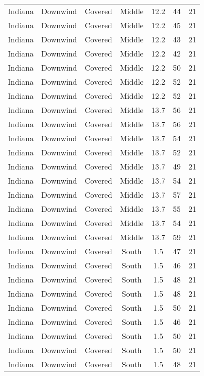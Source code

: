 \documentclass{article}
\begin{document}
\begin{longtable}[H]{ccccccc}
Indiana & Downwind & Covered     & Middle & 12.2 & 44 & 21 \\
Indiana & Downwind & Covered     & Middle & 12.2 & 45 & 21 \\
Indiana & Downwind & Covered     & Middle & 12.2 & 43 & 21 \\
Indiana & Downwind & Covered     & Middle & 12.2 & 42 & 21 \\
Indiana & Downwind & Covered     & Middle & 12.2 & 50 & 21 \\
Indiana & Downwind & Covered     & Middle & 12.2 & 52 & 21 \\
Indiana & Downwind & Covered     & Middle & 12.2 & 52 & 21 \\
Indiana & Downwind & Covered     & Middle & 13.7 & 56 & 21 \\
Indiana & Downwind & Covered     & Middle & 13.7 & 56 & 21 \\
Indiana & Downwind & Covered     & Middle & 13.7 & 54 & 21 \\
Indiana & Downwind & Covered     & Middle & 13.7 & 52 & 21 \\
Indiana & Downwind & Covered     & Middle & 13.7 & 49 & 21 \\
Indiana & Downwind & Covered     & Middle & 13.7 & 54 & 21 \\
Indiana & Downwind & Covered     & Middle & 13.7 & 57 & 21 \\
Indiana & Downwind & Covered     & Middle & 13.7 & 55 & 21 \\
Indiana & Downwind & Covered     & Middle & 13.7 & 54 & 21 \\
Indiana & Downwind & Covered     & Middle & 13.7 & 59 & 21 \\
Indiana & Downwind & Covered     & South  & 1.5  & 47 & 21 \\
Indiana & Downwind & Covered     & South  & 1.5  & 46 & 21 \\
Indiana & Downwind & Covered     & South  & 1.5  & 48 & 21 \\
Indiana & Downwind & Covered     & South  & 1.5  & 48 & 21 \\
Indiana & Downwind & Covered     & South  & 1.5  & 50 & 21 \\
Indiana & Downwind & Covered     & South  & 1.5  & 46 & 21 \\
Indiana & Downwind & Covered     & South  & 1.5  & 50 & 21 \\
Indiana & Downwind & Covered     & South  & 1.5  & 50 & 21 \\
Indiana & Downwind & Covered     & South  & 1.5  & 48 & 21 \\

\end{longtable}
\end{document}
